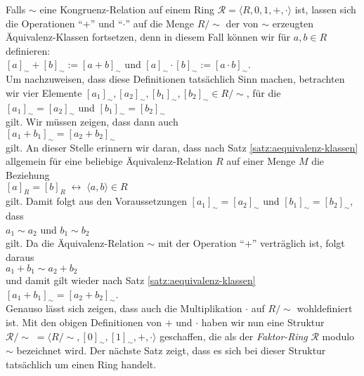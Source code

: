 Falls $\sim$ eine Kongruenz-Relation auf einem Ring $\mathcal{R} = \langle R, 0, 1, +, \cdot \rangle$ ist,
lassen sich die Operationen ``$+$'' und ``$\cdot$'' auf die Menge $R/\!\sim$ der von $\sim$ erzeugten
Äquivalenz-Klassen fortsetzen, denn in diesem Fall können wir für $a,b \in R$ definieren:
\\[0.2cm]
\hspace*{1.3cm}
$[a]_\sim + [b]_\sim := [ a + b ]_\sim$ \quad und \quad
$[a]_\sim \cdot [b]_\sim := [ a \cdot b ]_\sim$.
\\[0.2cm]
Um nachzuweisen, dass diese Definitionen tatsächlich Sinn machen, betrachten wir vier
 Elemente $[a_1]_\sim, [a_2]_\sim, [b_1]_\sim, [b_2]_\sim \in R/\!\sim$, für die
\\[0.2cm]
\hspace*{1.3cm}
$[a_1]_\sim = [a_2]_\sim$ \quad und \quad
$[b_1]_\sim = [b_2]_\sim$ 
\\[0.2cm]
gilt.  Wir müssen zeigen, dass dann auch 
\\[0.2cm]
\hspace*{1.3cm}
$[a_1 + b_1]_\sim = [a_2 + b_2]_\sim$
\\[0.2cm]
gilt.  An dieser Stelle erinnern wir daran, dass nach Satz \ref{satz:aequivalenz-klassen}
allgemein für eine beliebige Äquivalenz-Relation $R$ auf einer Menge $M$ die Beziehung
\\[0.2cm]
\hspace*{1.3cm}
$[a]_R = [b]_R \;\leftrightarrow\; \langle a, b \rangle \in R$
\\[0.2cm]
gilt.  Damit folgt aus den Voraussetzungen $[a_1]_\sim = [a_2]_\sim$ und $[b_1]_\sim = [b_2]_\sim$, dass
\\[0.2cm]
\hspace*{1.3cm}
$a_1 \sim a_2$ \quad und \quad $b_1 \sim b_2$
\\[0.2cm]
gilt.
Da die Äquivalenz-Relation $\sim$ mit der Operation ``$+$'' verträglich ist, folgt daraus
\\[0.2cm]
\hspace*{1.3cm}
$a_1 + b_1 \sim  a_2 + b_2$ 
\\[0.2cm]
und damit gilt wieder nach Satz \ref{satz:aequivalenz-klassen} 
\\[0.2cm]
\hspace*{1.3cm}
$[a_1 + b_1]_\sim = [a_2 + b_2]_\sim$. 
\\[0.2cm]
Genauso lässt sich zeigen, dass auch die Multiplikation $\cdot$ auf $R/\!\sim$ wohldefiniert ist.
Mit den obigen  Definitionen von $+$ und $\cdot$ haben wir nun eine Struktur 
$\mathcal{R}/\!\sim\; = \langle R/\!\sim, [0]_\sim, [1]_\sim, +, \cdot \rangle$ geschaffen, die als der
\emph{Faktor-Ring} $\mathcal{R}$ modulo $\sim$ bezeichnet wird. 
Der nächste Satz zeigt, dass es sich bei dieser Struktur tatsächlich um einen Ring handelt.

